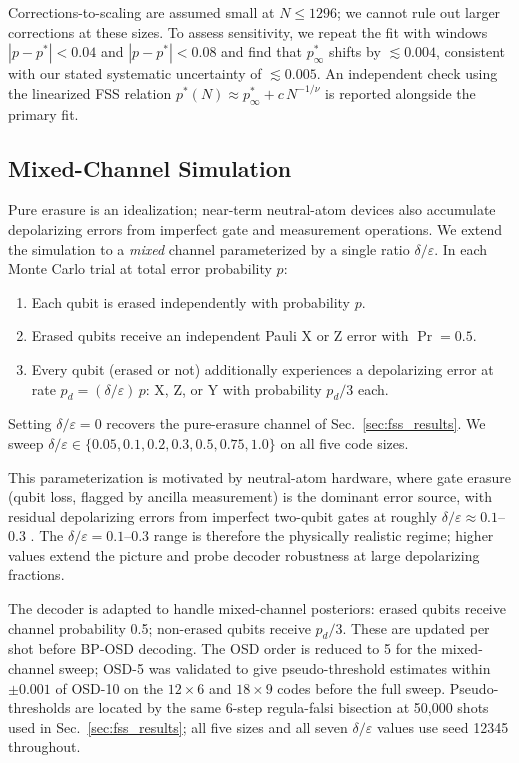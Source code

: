 \documentclass[a4paper]{quantumarticle}
\begin{document}
Corrections-to-scaling are assumed small at $N \leq 1296$; we cannot rule out larger
corrections at these sizes.
To assess sensitivity, we repeat the fit with windows $|p - p^*| < 0.04$ and
$|p - p^*| < 0.08$ and find that $p^*_\infty$ shifts by $\lesssim 0.004$, consistent with
our stated systematic uncertainty of $\lesssim 0.005$.
An independent check using the linearized FSS relation $p^*(N) \approx p^*_\infty + c\,N^{-1/\nu}$ \cite{dennis2002topological,bravyi2024high}
is reported alongside the primary fit.

\subsection{Mixed-Channel Simulation}\label{sec:mixed_methods}

Pure erasure is an idealization; near-term neutral-atom devices also accumulate
depolarizing errors from imperfect gate and measurement operations.
We extend the simulation to a \emph{mixed} channel parameterized by a single ratio
$\delta/\varepsilon$.
In each Monte Carlo trial at total error probability $p$:
\begin{enumerate}
    \item Each qubit is erased independently with probability $p$.
    \item Erased qubits receive an independent Pauli X or Z error with $\Pr = 0.5$.
    \item Every qubit (erased or not) additionally experiences a depolarizing error at rate
          $p_d = (\delta/\varepsilon)\,p$: X, Z, or Y with probability $p_d/3$ each.
\end{enumerate}
Setting $\delta/\varepsilon = 0$ recovers the pure-erasure channel of Sec.~\ref{sec:fss_results}.
We sweep $\delta/\varepsilon \in \{0.05, 0.1, 0.2, 0.3, 0.5, 0.75, 1.0\}$ on all five code sizes.

This parameterization is motivated by neutral-atom hardware, where gate erasure
(qubit loss, flagged by ancilla measurement) is the dominant error source, with residual
depolarizing errors from imperfect two-qubit gates at roughly
$\delta/\varepsilon \approx 0.1$--$0.3$ \cite{sahay2023highthreshold, evered2023highfidelity}.
The $\delta/\varepsilon = 0.1$--$0.3$ range is therefore the physically realistic regime;
higher values extend the picture and probe decoder robustness at large depolarizing fractions.

The decoder is adapted to handle mixed-channel posteriors: erased qubits receive channel
probability 0.5; non-erased qubits receive $p_d/3$.
These are updated per shot before BP-OSD decoding.
The OSD order is reduced to 5 for the mixed-channel sweep; OSD-5 was validated to give
pseudo-threshold estimates within $\pm 0.001$ of OSD-10 on the $12{\times}6$ and
$18{\times}9$ codes before the full sweep.
Pseudo-thresholds are located by the same 6-step regula-falsi bisection at 50{,}000
shots used in Sec.~\ref{sec:fss_results}; all five sizes and all seven $\delta/\varepsilon$
values use seed 12345 throughout.
\end{document}
